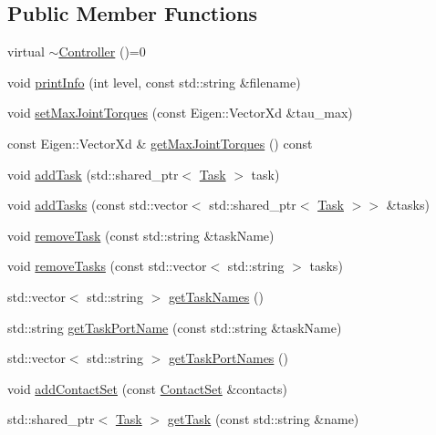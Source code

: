 \subsection*{Public Member Functions}
\begin{DoxyCompactItemize}
\item 
virtual \hyperlink{classocra_1_1Controller_a42bee636760563a73321de01ba972b6b}{$\sim$\+Controller} ()=0
\item 
void \hyperlink{classocra_1_1Controller_ad05741095a1e8f741cd3d4d67b40e239}{print\+Info} (int level, const std\+::string \&filename)
\item 
void \hyperlink{classocra_1_1Controller_a646510edd30c0fb5bc29e49917c32356}{set\+Max\+Joint\+Torques} (const Eigen\+::\+Vector\+Xd \&tau\+\_\+max)
\item 
const Eigen\+::\+Vector\+Xd \& \hyperlink{classocra_1_1Controller_a0a8d3dd851fa903ec902cde75cb36719}{get\+Max\+Joint\+Torques} () const 
\item 
void \hyperlink{classocra_1_1Controller_a2135ac360027e8fcca02182055a7f714}{add\+Task} (std\+::shared\+\_\+ptr$<$ \hyperlink{classocra_1_1Task}{Task} $>$ task)
\item 
void \hyperlink{classocra_1_1Controller_a75755b3a9b346283e4343e15e6f83ddb}{add\+Tasks} (const std\+::vector$<$ std\+::shared\+\_\+ptr$<$ \hyperlink{classocra_1_1Task}{Task} $>$$>$ \&tasks)
\item 
void \hyperlink{classocra_1_1Controller_a0794b232fe416785b6bfb9e5e380424f}{remove\+Task} (const std\+::string \&task\+Name)
\item 
void \hyperlink{classocra_1_1Controller_ad0e1a54d26697be34348d8fb85b368d4}{remove\+Tasks} (const std\+::vector$<$ std\+::string $>$ tasks)
\item 
std\+::vector$<$ std\+::string $>$ \hyperlink{classocra_1_1Controller_abecbaf3846371383eb3c6e8b2fef031b}{get\+Task\+Names} ()
\item 
std\+::string \hyperlink{classocra_1_1Controller_ae037e3554152ec025fbb7df09fba3deb}{get\+Task\+Port\+Name} (const std\+::string \&task\+Name)
\item 
std\+::vector$<$ std\+::string $>$ \hyperlink{classocra_1_1Controller_aa18b2870c3099225050b4e95121cdd3f}{get\+Task\+Port\+Names} ()
\item 
void \hyperlink{classocra_1_1Controller_a51496c52fab832f53fe080a013f13a0e}{add\+Contact\+Set} (const \hyperlink{classocra_1_1ContactSet}{Contact\+Set} \&contacts)
\item 
std\+::shared\+\_\+ptr$<$ \hyperlink{classocra_1_1Task}{Task} $>$ \hyperlink{classocra_1_1Controller_ab5ffcbcc07bf4191d38b75ef10214acb}{get\+Task} (const std\+::string \&name)
$$
\end{DoxyCompactItemize}
